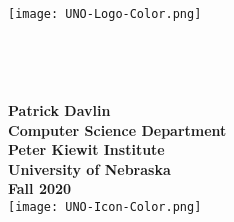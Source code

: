 
\begin{center}
  \texttt{[image: UNO-Logo-Color.png]}
  \\[0.3in]
  \textbf{\courseListing{}}\\
  \courseName{}
  \\[0.75in]
  \textbf{\assignmentTitle{}}\\
  \assignmentSubtitle{}
  \\[0.75in]
  \textbf{Patrick Davlin}
  \\[0.75in]
  \textbf{Computer Science Department}\\
  \textbf{Peter Kiewit Institute}\\
  \textbf{University of Nebraska}
  \\[0.75in]
  \textbf{Fall 2020}
  \\[0.3in]
  \texttt{[image: UNO-Icon-Color.png]}
  \newpage
\end{center}